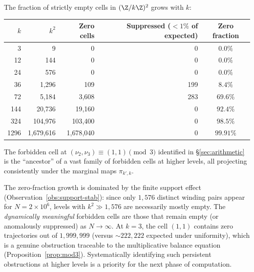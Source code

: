 \begin{empirical}
\label{obs:forbidden}
    The fraction of strictly empty cells in $(\Z/k\Z)^2$ grows with $k$:
    \begin{center}
    \renewcommand{\arraystretch}{1.15}
    \begin{tabular}{rrrrc}
        \toprule
        $k$ & $k^2$ & Zero cells & Suppressed ($<1\%$ of expected) & Zero fraction \\
        \midrule
        3  & 9       & 0    & 0    & $0.0\%$ \\
        12 & 144     & 0    & 0    & $0.0\%$ \\
        24 & 576     & 0    & 0    & $0.0\%$ \\
        36 & 1{,}296    & 109  & 199  & $8.4\%$ \\
        72 & 5{,}184    & 3{,}608 & 283 & $69.6\%$ \\
        144 & 20{,}736  & 19{,}160 & 0  & $92.4\%$ \\
        324 & 104{,}976 & 103{,}400 & 0 & $98.5\%$ \\
        1296 & 1{,}679{,}616 & 1{,}678{,}040 & 0 & $99.91\%$ \\
        \bottomrule
    \end{tabular}
    \end{center}
    The forbidden cell at $(\nu_2, \nu_3) \equiv (1,1) \pmod{3}$
    identified in \S\ref{sec:arithmetic} is the ``ancestor'' of a
    vast family of forbidden cells at higher levels, all projecting
    consistently under the marginal maps $\pi_{k',k}$.
\end{empirical}

\begin{remark}
    The zero-fraction growth is dominated by the finite support effect
    (Observation~\ref{obs:support-stab}): since only $1{,}576$ distinct
    winding pairs appear for $N = 2 \times 10^6$, levels with
    $k^2 \gg 1{,}576$ are necessarily mostly empty.  The
    \emph{dynamically meaningful} forbidden cells are those that remain
    empty (or anomalously suppressed) as $N \to \infty$.  At $k = 3$,
    the cell $(1,1)$ contains zero trajectories out of $1{,}999{,}999$
    (versus $\sim 222{,}222$ expected under uniformity), which is a
    genuine obstruction traceable to the multiplicative balance
    equation (Proposition~\ref{prop:mod3}).  Systematically identifying
    such persistent obstructions at higher levels is a priority for
    the next phase of computation.
\end{remark}


